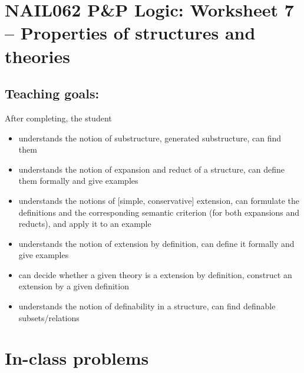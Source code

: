 \section*{NAIL062 P\&P Logic: Worksheet 7 -- Properties of structures and theories}


\subsection*{Teaching goals:} After completing, the student

    \begin{itemize}\setlength{\itemsep}{0pt}
        \item understands the notion of substructure, generated substructure, can find them
        \item understands the notion of expansion and reduct of a structure, can define them formally and give examples
        \item understands the notions of [simple, conservative] extension, can formulate the definitions and the corresponding semantic criterion (for both expansions and reducts), and apply it to an example
        \item understands the notion of extension by definition, can define it formally and give examples
        \item can decide whether a given theory is a extension by definition, construct an extension by a given definition
        \item understands the notion of definability in a structure, can find definable subsets/relations
    \end{itemize}

    

\section*{In-class problems}


